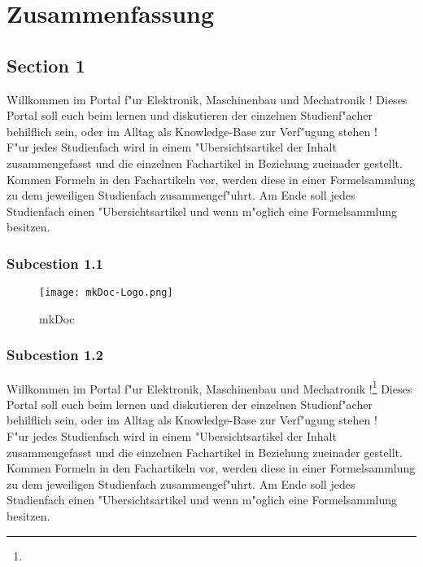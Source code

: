 \chapter{Zusammenfassung}
\label{cha:Zusammenfassung}

\section{Section 1}
\label{sec:7Section1}
Willkommen im Portal f"ur Elektronik, Maschinenbau und Mechatronik !
Dieses Portal soll euch beim lernen und diskutieren der einzelnen Studienf"acher behilflich sein, oder im Alltag als Knowledge-Base zur Verf"ugung stehen ! \\
F"ur jedes Studienfach wird in einem "Ubersichtsartikel der Inhalt zusammengefasst und die einzelnen Fachartikel in Beziehung zueinader gestellt. Kommen Formeln in den Fachartikeln vor, werden diese in einer Formelsammlung zu dem jeweiligen Studienfach zusammengef"uhrt. Am Ende soll jedes Studienfach einen "Ubersichtsartikel und wenn m"oglich eine Formelsammlung besitzen.

\subsection{Subcestion 1.1}
\label{subsec:7Subcestion1.1}

\begin{figure}[htb]
\centering
\texttt{[image: mkDoc-Logo.png]}
\caption{mkDoc}
\label{fig:mkDoc}
\end{figure}


\subsection{Subcestion 1.2}
\label{subsec:7Subcestion 1.2}
Willkommen im Portal f"ur Elektronik, Maschinenbau und Mechatronik !\footnote{\Vgl{}}
Dieses Portal soll euch beim lernen und diskutieren der einzelnen Studienf"acher behilflich sein, oder im Alltag als Knowledge-Base zur Verf"ugung stehen ! \\
F"ur jedes Studienfach wird in einem "Ubersichtsartikel der Inhalt zusammengefasst und die einzelnen Fachartikel in Beziehung zueinader gestellt. Kommen Formeln in den Fachartikeln vor, werden diese in einer Formelsammlung zu dem jeweiligen Studienfach zusammengef"uhrt. Am Ende soll jedes Studienfach einen "Ubersichtsartikel und wenn m"oglich eine Formelsammlung besitzen.
